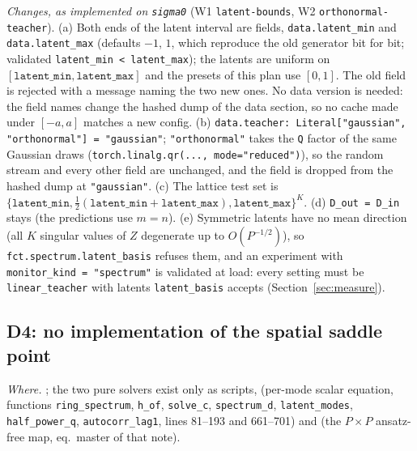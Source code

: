 \documentclass[11pt,a4paper]{article}
\newcommand{\code}[1]{\texttt{#1}}
\begin{document}
\emph{Changes, as implemented on \code{sigma0}} (W1 \code{latent-bounds}, W2 \code{orthonormal-teacher}). (a) Both ends of the latent interval are fields, \code{data.latent\_min} and \code{data.latent\_max} (defaults $-1$, $1$, which reproduce the old generator bit for bit; validated \code{latent\_min < latent\_max}); the latents are uniform on $[\code{latent\_min}, \code{latent\_max}]$ and the presets of this plan use $[0, 1]$. The old field is rejected with a message naming the two new ones. No data version is needed: the field names change the hashed dump of the data section, so no cache made under $[-a, a]$ matches a new config. (b) \code{data.teacher: Literal["gaussian", "orthonormal"] = "gaussian"}; \code{"orthonormal"} takes the \code{Q} factor of the same Gaussian draws (\code{torch.linalg.qr(..., mode="reduced")}), so the random stream and every other field are unchanged, and the field is dropped from the hashed dump at \code{"gaussian"}. (c) The lattice test set is $\{\code{latent\_min}, \frac12(\code{latent\_min} + \code{latent\_max}), \code{latent\_max}\}^K$. (d) \code{D\_out = D\_in} stays (the predictions use $m = n$). (e) Symmetric latents have no mean direction (all $K$ singular values of $Z$ degenerate up to $O(P^{-1/2})$), so \code{fct.spectrum.latent\_basis} refuses them, and an experiment with \code{monitor\_kind = "spectrum"} is validated at load: every setting must be \code{linear\_teacher} with latents \code{latent\_basis} accepts (Section~\ref{sec:measure}).

\subsection{D4: no implementation of the spatial saddle point}
\label{sec:D4}
\emph{Where.} ; the two pure solvers exist only as scripts,  (per-mode scalar equation, functions \code{ring\_spectrum}, \code{h\_of}, \code{solve\_c}, \code{spectrum\_d}, \code{latent\_modes}, \code{half\_power\_q}, \code{autocorr\_lag1}, lines 81--193 and 661--701) and  (the $P\times P$ ansatz-free map, eq.~master of that note).
\end{document}
